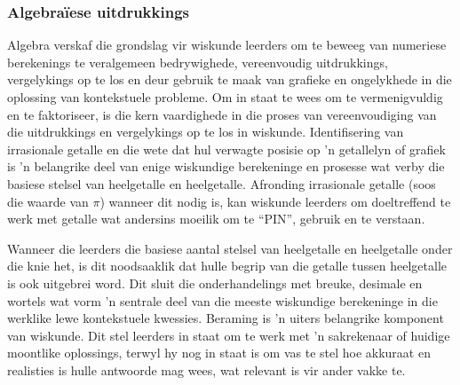 \subsubsection{Algebra\"{i}ese uitdrukkings}
Algebra verskaf die grondslag vir wiskunde leerders om te beweeg van
numeriese berekenings te veralgemeen bedrywighede, vereenvoudig
uitdrukkings, vergelykings op te los en deur gebruik te maak van
grafieke en ongelykhede in die oplossing van kontekstuele probleme. Om
in staat te wees om te vermenigvuldig en te faktoriseer, is die kern
vaardighede in die proses van vereenvoudiging van die uitdrukkings en
vergelykings op te los in wiskunde. Identifisering van irrasionale
getalle en die wete dat hul verwagte posisie op 'n getallelyn of
grafiek is 'n belangrike deel van enige wiskundige berekeninge en
prosesse wat verby die basiese stelsel van heelgetalle en heelgetalle.
Afronding irrasionale getalle (soos die waarde van $\pi$) wanneer dit
nodig is, kan wiskunde leerders om doeltreffend te werk met getalle
wat andersins moeilik om te ``PIN'', gebruik en te verstaan.

Wanneer die leerders die basiese aantal stelsel van heelgetalle en heelgetalle onder die knie het, is dit noodsaaklik dat hulle begrip van die getalle tussen heelgetalle is ook uitgebrei word. Dit sluit die onderhandelings met breuke, desimale en wortels wat vorm 'n sentrale deel van die meeste wiskundige berekeninge in die werklike lewe kontekstuele kwessies.
Beraming is 'n uiters belangrike komponent van wiskunde. Dit stel leerders in staat om te werk met 'n sakrekenaar of huidige moontlike oplossings, terwyl hy nog in staat is om vas te stel hoe akkuraat en realisties is hulle antwoorde mag wees, wat relevant is vir ander vakke te.

